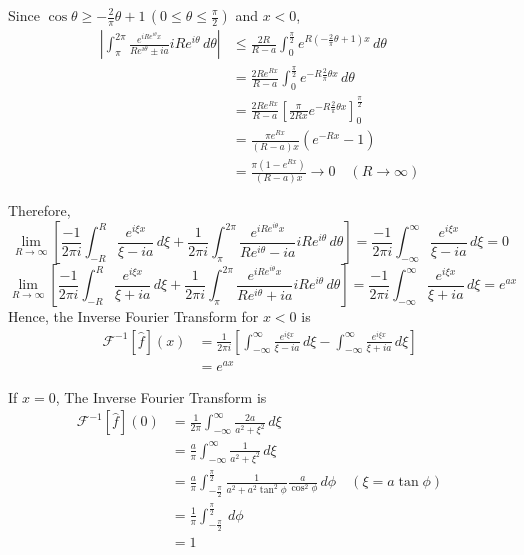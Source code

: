 \documentclass[letterpaper, 12pt]{article}
\theoremstyle{custom}
\begin{document}
Since $\cos \theta \geq -\displaystyle \frac{2}{\pi} \theta + 1 \, \left( 0\leq \theta \leq \displaystyle \frac{\pi}{2} \right)$ and $x<0$,
\begin{align*}
  \left| \int_{\pi}^{2\pi} \frac{e^{i Re^{i \theta} x}}{Re^{i \theta} \pm ia} iRe^{i \theta} \, d \theta \right|
  & \leq  \frac{2R}{R-a}\int_{0}^{\frac{\pi}{2}} e^{R \left( -\frac{2}{\pi}\theta + 1 \right) x} \, d \theta \\
  & =     \frac{2Re^{Rx}}{R-a}\int_{0}^{\frac{\pi}{2}} e^{-R\frac{2}{\pi}\theta x} \, d \theta \\
  & =     \frac{2Re^{Rx}}{R-a}\left[ \frac{\pi}{2Rx}e^{-R\frac{2}{\pi}\theta x} \right]_{0}^{\frac{\pi}{2}}\\
  & =     \frac{\pi e^{Rx}}{\left(R-a\right) x}\left( e^{-Rx} - 1 \right)\\
  & =     \frac{\pi \left( 1 - e^{Rx} \right)}{\left(R-a\right) x} \rightarrow 0 \quad (R \rightarrow \infty)
\end{align*}

Therefore,
\begin{equation*}
  \lim_{R \rightarrow \infty}\left[ \frac{-1}{2 \pi i} \int_{-R}^{R} \frac{e^{i\xi x}}{\xi-ia} \, d\xi  + \frac{1}{2 \pi i} \int_{\pi}^{2\pi} \frac{e^{i Re^{i \theta} x}}{Re^{i \theta}-ia} iRe^{i \theta} \, d \theta\right]
  = \frac{-1}{2 \pi i} \int_{-\infty}^{\infty} \frac{e^{i\xi x}}{\xi-ia} \, d\xi = 0
\end{equation*}
\begin{equation*}
  \lim_{R \rightarrow \infty}\left[ \frac{-1}{2 \pi i} \int_{-R}^{R} \frac{e^{i\xi x}}{\xi+ia} \, d\xi  + \frac{1}{2 \pi i} \int_{\pi}^{2\pi} \frac{e^{i Re^{i \theta} x}}{Re^{i \theta}+ia} iRe^{i \theta} \, d \theta\right]
  = \frac{-1}{2 \pi i} \int_{-\infty}^{\infty} \frac{e^{i\xi x}}{\xi+ia} \, d\xi = e^{a x}
\end{equation*}
Hence, the Inverse Fourier Transform for $x<0$ is
\begin{align*}
  \mathcal{F}^{-1}  \left[ \hat{f} \right] \left( x \right) 
  &= \frac{1}{2 \pi i} \left[ \int_{-\infty}^{\infty} \frac{e^{i\xi x}}{\xi-ia} \, d\xi -  \int_{-\infty}^{\infty} \frac{e^{i\xi x}}{\xi+ia} \, d\xi \right] \\
  &= e^{a x}
\end{align*}

If $x=0$, 
The Inverse Fourier Transform is
\begin{align*}
  \mathcal{F}^{-1}  \left[ \hat{f} \right] \left( 0 \right) 
  &= \frac{1}{2 \pi} \int_{-\infty}^{\infty} \frac{2a}{a^2+\xi^2} \, d\xi \\
  &= \frac{a}{\pi} \int_{-\infty}^{\infty} \frac{1}{a^2+\xi^2} \, d\xi \\
  &= \frac{a}{\pi} \int_{-\frac{\pi}{2}}^{\frac{\pi}{2}} \frac{1}{a^2+a^2\tan^2 \phi} \frac{a}{\cos^2 \phi} \, d\phi \quad (\xi = a \tan \phi)\\
  &= \frac{1}{\pi} \int_{-\frac{\pi}{2}}^{\frac{\pi}{2}}  \, d\phi\\
  &= 1
\end{align*}
\end{document}
